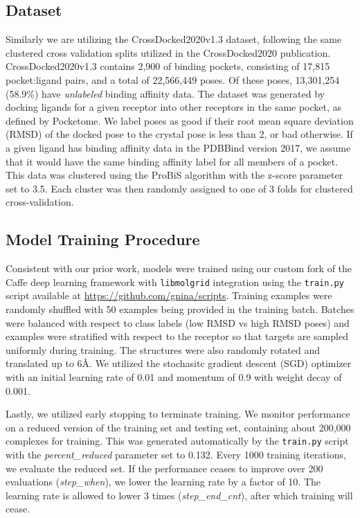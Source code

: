 \documentclass[journal=jmcmar,manuscript=article]{achemso}
\begin{document}
\subsection{Dataset}
Similarly we are utilizing the CrossDocked2020v1.3 dataset, following the same clustered cross validation splits utilized in the CrossDocked2020 publication.\cite{crossdocked2020}
CrossDocked2020v1.3 contains 2,900 of binding pockets, consisting of 17,815 pocket:ligand pairs, and a total of 22,566,449 poses.
Of these poses, 13,301,254 (58.9\%) have \emph{unlabeled} binding affinity data.
The dataset was generated by docking ligands for a given receptor into other receptors in the same pocket, as defined by Pocketome\cite{pocketome}.
We label poses as good if their root mean square deviation (RMSD) of the docked pose to the crystal pose is less than 2, or bad otherwise.
If a given ligand has binding affinity data in the PDBBind version 2017, we assume that it would have the same binding affinity label for all members of a pocket.
This data was clustered using the ProBiS \cite{ProBiS} algorithm with the z-score parameter set to 3.5.
Each cluster was then randomly assigned to one of 3 folds for clustered cross-validation.


\subsection{Model Training Procedure}
Consistent with our prior work\cite{crossdocked2020}, models were trained using our custom fork of the Caffe deep learning framework \cite{jia2014caffe} with \texttt{libmolgrid} integration \cite{sunseri2019libmolgrid} using the \texttt{train.py} script available at \url{https://github.com/gnina/scripts}.
Training examples were randomly shuffled with 50 examples being provided in the training batch.
Batches were balanced with respect to class labels (low RMSD vs high RMSD poses) and examples were stratified with respect to the receptor so that targets are sampled uniformly during training.
The structures were also randomly rotated and translated up to 6{\AA}.
We utilized the stochasitc gradient descent (SGD) optimizer with an initial learning rate of 0.01 and momentum of 0.9 with weight decay of 0.001.

Lastly, we utilized early stopping to terminate training.
We monitor performance on a reduced version of the training set and testing set, containing about 200,000 complexes for training.
This was generated automatically by the \texttt{train.py} script with the \textit{percent\_reduced} parameter set to 0.132.
Every 1000 training iterations, we evaluate the reduced set.
If the performance ceases to improve over 200 evaluations (\textit{step\_when}), we lower the learning rate by a factor of 10.
The learning rate is allowed to lower 3 times (\textit{step\_end\_cnt}), after which training will cease.
\end{document}
